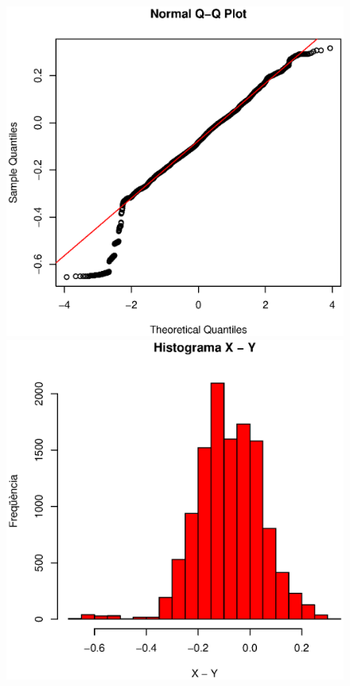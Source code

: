 \begin{figure}
\centering
\begin{minipage}{0.45\linewidth}
\includegraphics[width=1\linewidth]{images/qqplot}
\caption{}
\label{fig:qqplot}
\end{minipage}
\hfill
\begin{minipage}{0.45\linewidth}
\includegraphics[width=1\linewidth]{images/histograma}
\caption{}
\label{fig:histograma}
\end{minipage}
\end{figure}

